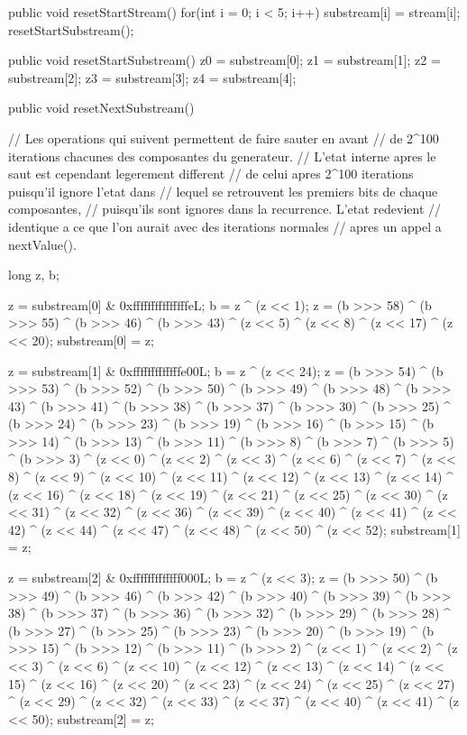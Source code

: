 \begin{code}
  \begin{hide}



    public void resetStartStream() {
        for(int i = 0; i < 5; i++)
            substream[i] = stream[i];
        resetStartSubstream();
    }

    public void resetStartSubstream() {
        z0 = substream[0];
        z1 = substream[1];
        z2 = substream[2];
        z3 = substream[3];
        z4 = substream[4];
    }

    public void resetNextSubstream() {
        // Les operations qui suivent permettent de faire sauter en avant
        // de 2^100 iterations chacunes des composantes du generateur.
        // L'etat interne apres le saut est cependant legerement different
        // de celui apres 2^100 iterations puisqu'il ignore l'etat dans
        // lequel se retrouvent les premiers bits de chaque composantes,
        // puisqu'ils sont ignores dans la recurrence. L'etat redevient
        // identique a ce que l'on aurait avec des iterations normales
        // apres un appel a nextValue().

        long z, b;

        z = substream[0] & 0xfffffffffffffffeL;
        b = z ^ (z << 1);
        z = (b >>> 58) ^ (b >>> 55) ^ (b >>> 46) ^ (b >>> 43) ^ (z << 5) ^
            (z << 8) ^ (z << 17) ^ (z << 20);
        substream[0] = z;


        z = substream[1] & 0xfffffffffffffe00L;
        b = z ^ (z << 24);
        z = (b >>> 54) ^ (b >>> 53) ^ (b >>> 52) ^ (b >>> 50) ^ (b >>> 49) ^
            (b >>> 48) ^ (b >>> 43) ^ (b >>> 41) ^ (b >>> 38) ^ (b >>> 37) ^
            (b >>> 30) ^ (b >>> 25) ^ (b >>> 24) ^ (b >>> 23) ^ (b >>> 19) ^
            (b >>> 16) ^ (b >>> 15) ^ (b >>> 14) ^ (b >>> 13) ^ (b >>> 11) ^
            (b >>> 8) ^ (b >>> 7) ^ (b >>> 5) ^ (b >>> 3) ^ (z << 0) ^
            (z << 2) ^ (z << 3) ^ (z << 6) ^ (z << 7) ^ (z << 8) ^ (z << 9) ^
            (z << 10) ^ (z << 11) ^ (z << 12) ^ (z << 13) ^ (z << 14) ^
            (z << 16) ^ (z << 18) ^ (z << 19) ^ (z << 21) ^ (z << 25) ^
            (z << 30) ^ (z << 31) ^ (z << 32) ^ (z << 36) ^ (z << 39) ^
            (z << 40) ^ (z << 41) ^ (z << 42) ^ (z << 44) ^ (z << 47) ^
            (z << 48) ^ (z << 50) ^ (z << 52);
        substream[1] = z;


        z = substream[2] & 0xfffffffffffff000L;
        b = z ^ (z << 3);
        z = (b >>> 50) ^ (b >>> 49) ^ (b >>> 46) ^ (b >>> 42) ^ (b >>> 40) ^
            (b >>> 39) ^ (b >>> 38) ^ (b >>> 37) ^ (b >>> 36) ^ (b >>> 32) ^
            (b >>> 29) ^ (b >>> 28) ^ (b >>> 27) ^ (b >>> 25) ^ (b >>> 23) ^
            (b >>> 20) ^ (b >>> 19) ^ (b >>> 15) ^ (b >>> 12) ^ (b >>> 11) ^
            (b >>> 2) ^ (z << 1) ^ (z << 2) ^ (z << 3) ^ (z << 6) ^ (z << 10) ^
            (z << 12) ^ (z << 13) ^ (z << 14) ^ (z << 15) ^ (z << 16) ^
            (z << 20) ^ (z << 23) ^ (z << 24) ^ (z << 25) ^ (z << 27) ^
            (z << 29) ^ (z << 32) ^ (z << 33) ^ (z << 37) ^ (z << 40) ^
            (z << 41) ^ (z << 50);
        substream[2] = z;


}
\end{hide}
\end{code}
